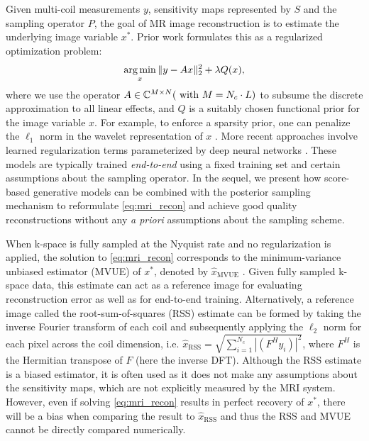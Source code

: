 Given multi-coil measurements $y$, sensitivity maps represented by $S$ and the sampling operator $P$, the goal of MR image reconstruction is to estimate the underlying image variable $x^*$. Prior work formulates this as a regularized optimization problem:
\begin{equation}
    \operatorname*{arg\,min}_{x} \|y - A x\|_2^2 + \lambda Q(x),
    \label{eq:mri_recon}
\end{equation}
\noindent where we use the operator $A\in\mathbb{C}^{M\times N} (\text{ with } M=N_c \cdot L)$ to subsume the discrete approximation to all linear effects, and $Q$ is a suitably chosen functional prior for the image variable $x$. For example, to enforce a sparsity prior, one can penalize the $\ell_1$ norm in the wavelet representation of $x$ \cite{lustig2007sparse}. More recent approaches involve learned regularization terms parameterized by deep neural networks \cite{schlemper2017deep,hammernik2018learning,aggarwal2018modl}. These models are typically trained \textit{end-to-end} using a fixed training set and certain assumptions about the sampling operator. In the sequel, we present how score-based generative models can be combined with the posterior sampling~\cite{jalal2021instance} mechanism to reformulate \eqref{eq:mri_recon} and achieve good quality reconstructions without any \textit{a priori} assumptions about the sampling scheme. 

When k-space is fully sampled at the Nyquist rate and no regularization is applied, the solution to \eqref{eq:mri_recon} corresponds to the minimum-variance unbiased estimator (MVUE) of $x^*$, denoted by $\hat{x}_{\mathrm{MVUE}}$ \cite{pruessmann1999sense}. Given fully sampled k-space data, this estimate can act as a reference image for evaluating reconstruction error as well as for end-to-end training.
Alternatively, a reference image called the root-sum-of-squares (RSS) estimate can be formed
by taking the inverse Fourier transform of each coil and subsequently applying the $\ell_2$ norm for each pixel across the coil dimension, i.e. $\hat{x}_{\mathrm{RSS}} =\sqrt{\sum_{i=1}^{N_c} \left|\left(F^H y_i\right)\right|^2}$,
where $F^H$ is the Hermitian transpose of $F$ (here the inverse DFT).
Although the RSS estimate is a biased estimator, it is often used as it does not make any assumptions about the sensitivity maps, which are not explicitly measured by the MRI system.
However, even if solving \eqref{eq:mri_recon} results in perfect recovery of $x^*$, there will be a bias when comparing the result to $\hat{x}_{\mathrm{RSS}}$ and thus the RSS and MVUE cannot be directly compared numerically.

